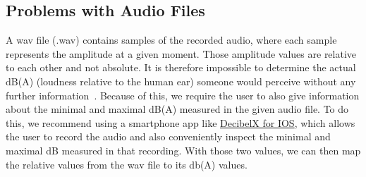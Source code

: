 \subsection{Problems with Audio Files}\label{subsec:problems-with-audio-files}
A wav file (.wav) contains samples of the recorded audio, where each sample represents the amplitude at a given moment.
Those amplitude values are relative to each other and not absolute.
It is therefore impossible to determine the actual dB(A) (loudness relative to the human ear) someone would perceive without any further information~\cite{adobe_community_how_to_know_the_real_world_db_level_of_a_file,stackoverflow_how_can_i_calculate_audio_db_level,stackexchange_exteracting_sound_pressure_from_wav_file}.
Because of this, we require the user to also give information about the minimal and maximal dB(A) measured in the given audio file.
To do this, we recommend using a smartphone app like \href{https://apps.apple.com/ch/app/dezibel-x-dba-l\%C3\%A4rm-messger\%C3\%A4t/id448155923}{DecibelX for IOS},
which allows the user to record the audio and also conveniently inspect the minimal and maximal dB measured in that recording.
With those two values, we can then map the relative values from the wav file to its db(A) values.